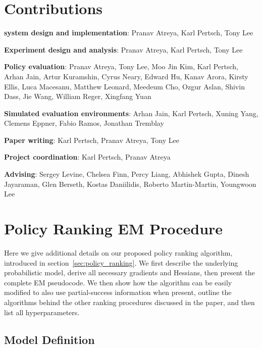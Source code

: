\appendix

\section{Contributions}
\label{sec:contributions}

\textbf{\Acronym{} system design and implementation}: Pranav Atreya, Karl Pertsch, Tony Lee

\textbf{Experiment design and analysis}: Pranav Atreya, Karl Pertsch, Tony Lee

\textbf{Policy evaluation}: Pranav Atreya, Tony Lee, Moo Jin Kim, Karl Pertsch, Arhan Jain, Artur Kuramshin, Cyrus Neary, Edward Hu, Kanav Arora, Kirsty Ellis, Luca Macesanu, Matthew Leonard, Meedeum Cho, Ozgur Aslan, Shivin Dass, Jie Wang, William Reger, Xingfang Yuan

\textbf{Simulated evaluation environments}: Arhan Jain, Karl Pertsch, Xuning Yang, Clemens Eppner, Fabio Ramos, Jonathan Tremblay

\textbf{Paper writing}: Karl Pertsch, Pranav Atreya, Tony Lee

\textbf{Project coordination}: Karl Pertsch, Pranav Atreya

\textbf{Advising}: Sergey Levine, Chelsea Finn, Percy Liang, Abhishek Gupta, Dinesh Jayaraman, Glen Berseth, Kostas Daniilidis, Roberto Martin-Martin, Youngwoon Lee


\section{Policy Ranking EM Procedure}
\label{app:ranking_model}


Here we give additional details on our proposed policy ranking algorithm, introduced in section~\ref{sec:policy_ranking}. We first describe the underlying probabilistic model, derive all necessary gradients and Hessians, then present the complete EM pseudocode.  We then show how the algorithm can be easily modified to also use partial-success information when present, outline the algorithms behind the other ranking procedures discussed in the paper, and then list all hyperparameters.

\subsection{Model Definition}
\label{app:model_definition}

